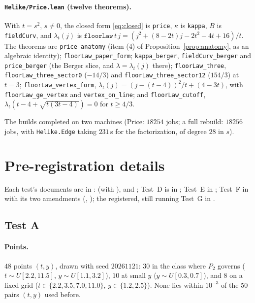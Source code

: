 \documentclass[11pt]{article}
\theoremstyle{definition}
\theoremstyle{remark}
\begin{document}
\paragraph{\texttt{Helike/Price.lean} (twelve theorems).} With $t=s^2$, $s\ne0$, the closed form \eqref{eq:closed} is
\texttt{price}, $\kappa$ is \texttt{kappa}, $B$ is \texttt{fieldCurv}, and $\lambda_t(j)$ is
$\mathtt{floorLaw}\,t\,j=(j^2+(8-2t)j-2t^2-4t+16)/t$. The theorems are \texttt{price\_anatomy} (item (4) of
Proposition~\ref{prop:anatomy}, as an algebraic identity); \texttt{floorLaw\_paper\_form}; \texttt{kappa\_berger},
\texttt{fieldCurv\_berger} and \texttt{price\_berger} (the Berger slice, and $\lambda=\lambda_t(j)$ there);
\texttt{floorLaw\_three}, \texttt{floorLaw\_three\_sector0} ($-14/3$) and \texttt{floorLaw\_three\_sector12} ($154/3$) at
$t=3$; \texttt{floorLaw\_vertex\_form}, $\lambda_t(j)=(j-(t-4))^2/t+(4-3t)$, with \texttt{floorLaw\_ge\_vertex} and
\texttt{vertex\_on\_line}; and \texttt{floorLaw\_cutoff}, $\lambda_t(t-4+\sqrt{t(3t-4)})=0$ for $t\ge4/3$.

The builds completed on two machines (Price: $18254$ jobs; a full rebuild: $18256$ jobs, with \texttt{Helike.Edge}
taking $231$\,s for the factorization, of degree $28$ in $s$).

\section{Pre-registration details}\label{app:prereg}

Each test's documents are in :  (with
),  and ; Test~D is in
; Test~E in
; Test~F in
 with its two amendments
(, ); the registered, still running Test~G
in .

\subsection{Test A}

\paragraph{Points.} $48$ points $(t,y)$, drawn with seed $20261121$: $30$ in the class where $P_2$ governs
($t\sim U[2.2,11.5]$, $y\sim U[1.1,3.2]$), $10$ at small $y$ ($y\sim U[0.3,0.7]$), and $8$ on a fixed grid
($t\in\{2.2,3.5,7.0,11.0\}$, $y\in\{1.2,2.5\}$). None lies within $10^{-3}$ of the $50$ pairs $(t,y)$ used before.
\end{document}
